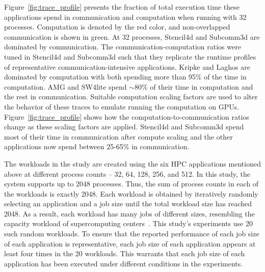 Figure~\ref{fig:trace_profile} presents the fraction of total execution
time these applications spend in communication and computation when running
with 32 processes.  Computation is denoted by the red color, and non-overlapped
communication is shown in green. At 32 processes, Stencil4d and Subcomm3d are
dominated by communication. The communication-computation ratios were tuned in
Stencil4d and Subcomm3d such that they replicate the runtime profiles of
representative communication-intensive applications.  Kripke and Laghos are
dominated by computation with both spending more than 95\% of the time in computation.
AMG and SW4lite spend $\sim$80\% of their time in computation and the rest in
communication.  Suitable
computation scaling factors are used to alter the behavior of these traces to
emulate running the computation on GPUs. Figure~\ref{fig:trace_profile} 
shows how the computation-to-communication ratios change as these
scaling factors are applied. Stencil4d and Subcomm3d spend most of their time in
communication after compute scaling and the other applications now spend
between 25-65\% in communication.

The workloads in the study are created using the six HPC applications mentioned
above at different process counts -- 32, 64, 128, 256, and 512.  In this study,
the system supports up to 2048 processes. Thus, the sum of process counts in
each of the workloads is exactly 2048.  Each workload is obtained by
iteratively randomly selecting an application and a job size until the total
workload size has reached 2048.  As a result, each workload has many jobs of
different sizes, resembling the capacity workload of supercomputing
centers~\cite{jain2016evaluating}.  This study's experiments use 20 such random
workloads. To ensure that the reported performance of each job size of each
application is representative, each job size of each application
appears at least four times in the 20 workloads. This warrants that each job
size of each application has been executed under different conditions in the
experiments.
 
